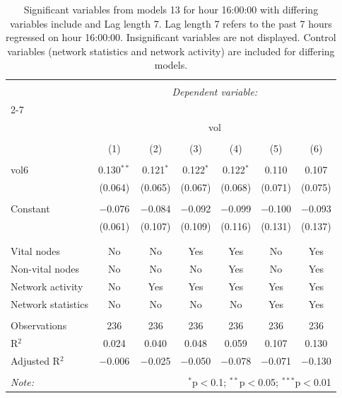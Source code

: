 
\begin{table}[!htbp] \centering 
  \caption{Significant variables from models 13 for hour 16:00:00 with differing variables include 
                               and Lag length 7. Lag length 7 refers to the past 7 hours regressed on hour 16:00:00. 
                               Insignificant variables are not displayed. 
                               Control variables (network statistics and network activity) are 
                               included for differing models.} 
  \label{Volumemodels1_t_hourlagged3} 
\scriptsize 
\begin{tabular}{@{\extracolsep{5pt}}lcccccc} 
\\[-1.8ex]\hline 
\hline \\[-1.8ex] 
 & \multicolumn{6}{c}{\textit{Dependent variable:}} \\ 
\cline{2-7} 
\\[-1.8ex] & \multicolumn{6}{c}{vol} \\ 
\\[-1.8ex] & (1) & (2) & (3) & (4) & (5) & (6)\\ 
\hline \\[-1.8ex] 
 vol6 & 0.130$^{**}$ & 0.121$^{*}$ & 0.122$^{*}$ & 0.122$^{*}$ & 0.110 & 0.107 \\ 
  & (0.064) & (0.065) & (0.067) & (0.068) & (0.071) & (0.075) \\ 
  & & & & & & \\ 
 Constant & $-$0.076 & $-$0.084 & $-$0.092 & $-$0.099 & $-$0.100 & $-$0.093 \\ 
  & (0.061) & (0.107) & (0.109) & (0.116) & (0.131) & (0.137) \\ 
  & & & & & & \\ 
\hline \\[-1.8ex] 
Vital nodes & No & No & Yes & Yes & No & Yes \\ 
Non-vital nodes & No & No & No & Yes & No & Yes \\ 
Network activity & No & Yes & Yes & Yes & Yes & Yes \\ 
Network statistics & No & No & No & No & Yes & Yes \\ 
\hline &  &  &  &  &  &  \\ 
Observations & 236 & 236 & 236 & 236 & 236 & 236 \\ 
R$^{2}$ & 0.024 & 0.040 & 0.048 & 0.059 & 0.107 & 0.130 \\ 
Adjusted R$^{2}$ & $-$0.006 & $-$0.025 & $-$0.050 & $-$0.078 & $-$0.071 & $-$0.130 \\ 
\hline 
\hline \\[-1.8ex] 
\textit{Note:}  & \multicolumn{6}{r}{$^{*}$p$<$0.1; $^{**}$p$<$0.05; $^{***}$p$<$0.01} \\ 
\end{tabular} 
\end{table} 
